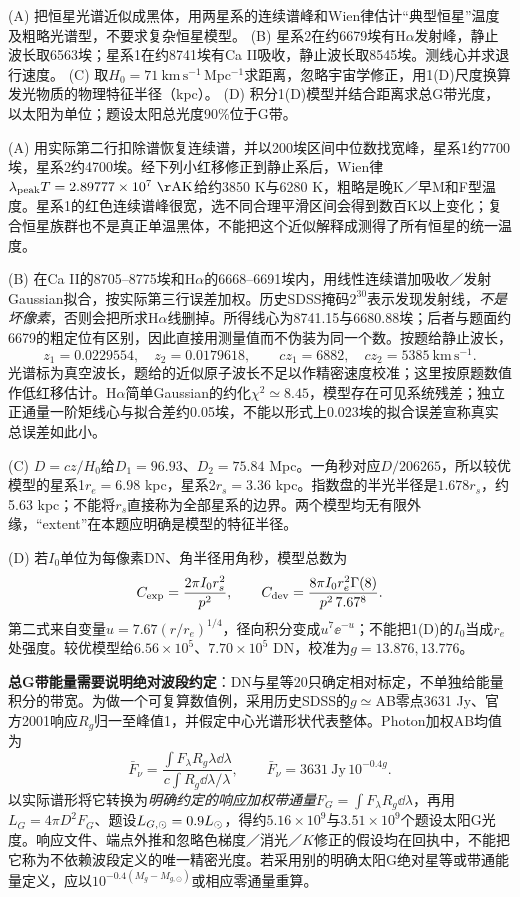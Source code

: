 \begin{exercise}
(A) 把恒星光谱近似成黑体，用两星系的连续谱峰和Wien律估计“典型恒星”温度及粗略光谱型，不要求复杂恒星模型。
(B) 星系2在约6679埃有H$\alpha$发射峰，静止波长取6563埃；星系1在约8741埃有Ca II吸收，静止波长取8545埃。测线心并求退行速度。
(C) 取$H_0=71\ \mathrm{km\,s^{-1}\,Mpc^{-1}}$求距离，忽略宇宙学修正，用1(D)尺度换算发光物质的物理特征半径（kpc）。
(D) 积分1(D)模型并结合距离求总G带光度，以太阳为单位；题设太阳总光度90\%位于G带。
\end{exercise}
\begin{solution}
(A) 用实际第二行扣除谱恢复连续谱，并以200埃区间中位数找宽峰，星系1约7700埃，星系2约4700埃。经下列小红移修正到静止系后，Wien律$\lambda_{ \rm peak}T=2.89777\times10^7\ \mathrm{\AA K}$给约3850 K与6280 K，粗略是晚K／早M和F型温度。星系1的红色连续谱峰很宽，选不同合理平滑区间会得到数百K以上变化；复合恒星族群也不是真正单温黑体，不能把这个近似解释成测得了所有恒星的统一温度。

(B) 在Ca II的8705--8775埃和H$\alpha$的6668--6691埃内，用线性连续谱加吸收／发射Gaussian拟合，按实际第三行误差加权。历史SDSS掩码$2^{30}$表示发现发射线，\emph{不是坏像素}，否则会把所求H$\alpha$线删掉。所得线心为8741.15与6680.88埃；后者与题面约6679的粗定位有区别，因此直接用测量值而不伪装为同一个数。按题给静止波长，
\[
 z_1=0.0229554,\quad z_2=0.0179618,\qquad
 cz_1=6882,\quad cz_2=5385\ \mathrm{km\,s^{-1}}.
\]
光谱标为真空波长，题给的近似原子波长不足以作精密速度校准；这里按原题数值作低红移估计。H$\alpha$简单Gaussian的约化$\chi^2\simeq8.45$，模型存在可见系统残差；独立正通量一阶矩线心与拟合差约0.05埃，不能以形式上0.023埃的拟合误差宣称真实总误差如此小。

(C) $D=cz/H_0$给$D_1=96.93$、$D_2=75.84$ Mpc。一角秒对应$D/206265$，所以较优模型的星系1$r_e=6.98$ kpc，星系2$r_s=3.36$ kpc。指数盘的半光半径是$1.678r_s$，约5.63 kpc；不能将$r_s$直接称为全部星系的边界。两个模型均无有限外缘，“extent”在本题应明确是模型的特征半径。

(D) 若$I_0$单位为每像素DN、角半径用角秒，模型总数为
\[
 C_{ \rm exp}=\frac{2\pi I_0r_s^2}{p^2},\qquad
 C_{ \rm dev}=\frac{8\pi I_0r_e^2\Gamma(8)}{p^2\,7.67^8}.
\]
第二式来自变量$u=7.67(r/r_e)^{1/4}$，径向积分变成$u^7\ee^{-u}$；不能把1(D)的$I_0$当成$r_e$处强度。较优模型给$6.56\times10^5$、$7.70\times10^5$ DN，校准为$g=13.876,13.776$。

\textbf{总G带能量需要说明绝对波段约定}：DN与星等20只确定相对标定，不单独给能量积分的带宽。为做一个可复算数值例，采用历史SDSS的$g\simeq$AB零点3631 Jy、官方2001响应$R_g$归一至峰值1，并假定中心光谱形状代表整体。Photon加权AB均值为
\[
 \bar F_\nu=\frac{\int F_\lambda R_g\lambda\dd\lambda}
 {c\int R_g\dd\lambda/\lambda},\qquad
 \bar F_\nu=3631\ \mathrm{Jy}\,10^{-0.4g}.
\]
以实际谱形将它转换为\emph{明确约定的响应加权带通量}$F_G=\int F_\lambda R_g\dd\lambda$，再用$L_G=4\pi D^2F_G$、题设$L_{G,\odot}=0.9L_{\odot}$，得约$5.16\times10^9$与$3.51\times10^9$个题设太阳G光度。响应文件、端点外推和忽略色梯度／消光／$K$修正的假设均在回执中，不能把它称为不依赖波段定义的唯一精密光度。若采用别的明确太阳G绝对星等或带通能量定义，应以$10^{-0.4(M_g-M_{g,\odot})}$或相应零通量重算。
\end{solution}

